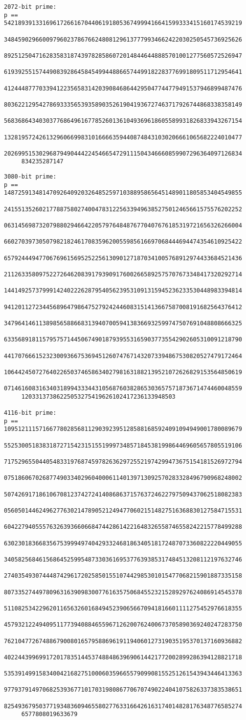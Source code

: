 \documentclass{article}
\begin{document}
\begin{small}
\begin{verbatim}
2072-bit prime:
p == 54218939133169617266167044061918053674999416641599333415160174539219
     34845902966009796023786766248081296137779934662422030250545736925626
     89251250471628358318743978285860720148446448885701001277560572526947
     61939255157449083928645845499448866574499182283776991809511712954641
     41244487770339412235658314203908468644295047744779491537946899487476
     80362212954278693335653935890352619041936727463717926744868338358149
     56836864340303776864961677852601361049369618605589931826833943267154
     13281957242613296066998310166663594408748431030206661065682224010477
     20269951530296879490444224546654729111504346660859907296364097126834
     834235287147
\end{verbatim}
\newpage
\begin{verbatim}
3080-bit prime:
p == 14872591348147092640920326485259710388958656451489011805853404549855
     24155135260217788758027400478312256339496385275012465661575576202252
     06314569873207988029466422057976484876770407676185319721656326266004
     66027039730507982182461708359620055985616697068444694474354610925422
     65792444947706769615695252256130901271870341005768912974433684521436
     21126335809752272646208391793909176002665892575707673348417320292714
     14414925737999142402226287954056239531091315945236233530448983394814
     94120112723445689647986475279242446083151413667587008191682564376412
     34796414611389856588668313940700594138366932599747507691048808666325
     63356891811579575714450674901879395531659037735542902605310091218790
     44170766615232300936675369451260747671432073394867530820527479172464
     10644245072764022650374658634027981631882139521072626829153564850619
     07146160831634031899433344310568760382865303657571873671474460048559
     12033137386225053275419626102417236133948503

4116-bit prime:
p == 10951211157166778028568112903923951285881685924091094949001780089679
     55253005183831872715423151551999734857184538199864469605657805519106
     71752965504405483319768745978263629725521974299473675154181526972794
     07518606702687749033402960400061140139713092570283328496790968248002
     50742691718610670812374272414086863715763724622797509437062518082383
     05605014462496277630214789052124947706021514827516368830127584715531
     60422794055576326393660668474428614221648326558746558242215778499288
     63023018366835675399949740429332468186340518172487073360822220449055
     34058256846156864525995487330361695377639385317484513208112197632746
     27403549307444874296172025850155107442985301015477068215901887335158
     80733527449780963163909830077616357506845523215289297624086914545378
     51108253422962011656326016849452390656670941816601111275452976618355
     45793212249409511773940884655967126200762400673705890369240247283750
     76210477267488679008016579588696191194060127319035195370137160936882
     40224439969917201783514453748848639690614421772002899286394128821718
     53539149915834004216827510006035966557909908155251261543943446413363
     97793791497068253936771017031980867706707490224041075826337383538651
     82549367950377193483609465580277633166426163174014828176348776585274
     6577808019633679
\end{verbatim}
\end{small}
\end{document}
